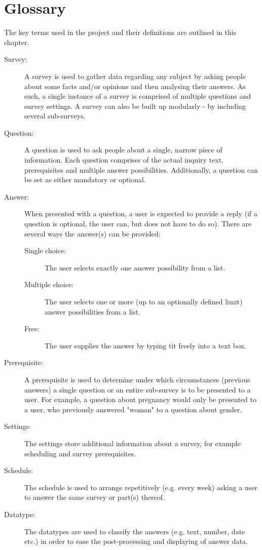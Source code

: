 \chapter{Glossary}
\label{chap:glossary}
The key terms used in the project and their definitions are outlined in this chapter.

\begin{description}
\item[Survey:] A survey is used to gather data regarding any subject by asking people about some facts and/or opinions and then analysing their answers. As such, a single instance of a survey is comprised of multiple questions and survey settings. A survey can also be built up modularly - by including several sub-surveys.
\item[Question:] A question is used to ask people about a single, narrow piece of information. Each question comprises of the actual inquiry text, prerequisites and multiple answer possibilities. Additionally, a question can be set as either mandatory or optional.
\item[Answer:] When presented with a question, a user is expected to provide a reply (if a question is optional, the user can, but does not have to do so). There are several ways the answer(s) can be provided:
  \begin{description}
    \item[Single choice:] The user selects exactly one answer possibility from a list.
    \item[Multiple choice:] The user selects one or more (up to an optionally defined limit) answer possibilities from a list.
    \item[Free:] The user supplies the answer by typing tit freely into a text box.
  \end{description}
\item[Prerequisite:] A prerequisite is used to determine under which circumstances (previous answers) a single question or an entire sub-survey is to be presented to a user. For example, a question about pregnancy would only be presented to a user, who previously answered "woman" to a question about gender.
\item[Settings:] The settings store additional information about a survey, for example scheduling and survey prerequisites.
\item[Schedule:] The schedule is used to arrange repetitively (e.g. every week) asking a user to answer the same survey or part(s) thereof.
\item[Datatype:] The datatypes are used to classify the answers (e.g. text, number, date etc.) in order to ease the post-processing and displaying of answer data.
\end{description}